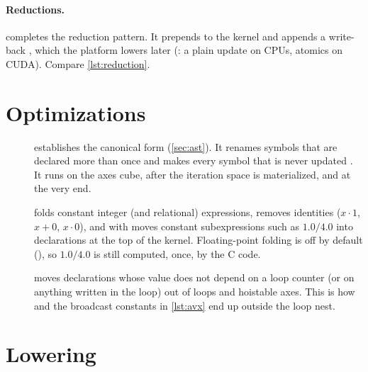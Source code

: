 \paragraph{Reductions.}
 completes the reduction pattern. It prepends
 to the kernel and appends a write-back
, which the platform lowers later
(: a plain update on CPUs, atomics on CUDA). Compare
\cref{lst:reduction}.

\section{Optimizations}

\begin{description}
  \item[] establishes the canonical form (\cref{sec:ast}). It
    renames symbols that are declared more than once and makes every symbol that is never
    updated . It runs on the axes cube, after the iteration space is
    materialized, and at the very end.
  \item[] folds constant integer (and relational) expressions,
    removes identities ($x\cdot 1$, $x+0$, $x\cdot 0$), and with
     moves constant subexpressions such as
    $1.0/4.0$ into declarations  at the top of the kernel. Floating-point
    folding is off by default (), so $1.0/4.0$ is still
    computed, once, by the C code.
  \item[] moves declarations whose value does
    not depend on a loop counter (or on anything written in the loop) out of loops and
    hoistable axes. This is how  and the broadcast constants in
    \cref{lst:avx} end up outside the loop nest.
\end{description}

\section{Lowering}

